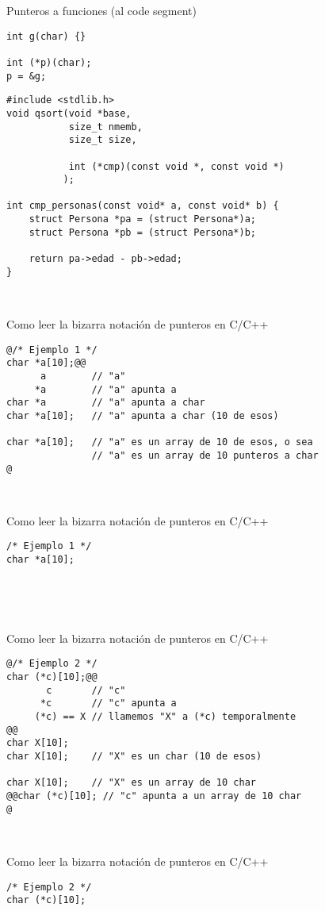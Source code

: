 \begin{frame}[fragile]{Punteros a funciones (al code segment)}
         \begin{lstlisting}[style=normal]
int g(char) {}

int (*p)(char);
p = &g;
         \end{lstlisting}
\pause
         \begin{lstlisting}[style=normal]
#include <stdlib.h>
void qsort(void *base,
           size_t nmemb,
           size_t size,

           int (*cmp)(const void *, const void *)
          );

int cmp_personas(const void* a, const void* b) {
    struct Persona *pa = (struct Persona*)a;
    struct Persona *pb = (struct Persona*)b;

    return pa->edad - pb->edad;
}

         \end{lstlisting}
\end{frame}


~%
\begin{frame}[fragile]{Como leer la bizarra notaci\'on de punteros en C/C++}
         \begin{lstlisting}[style=dimmided]
@/* Ejemplo 1 */
char *a[10];@@
      a        // "a"
     *a        // "a" apunta a
char *a        // "a" apunta a char
char *a[10];   // "a" apunta a char (10 de esos)

char *a[10];   // "a" es un array de 10 de esos, o sea
               // "a" es un array de 10 punteros a char
@
         \end{lstlisting}
\end{frame}
~%
\begin{frame}[fragile,t]{Como leer la bizarra notaci\'on de punteros en C/C++}
         \begin{lstlisting}[style=normal]
/* Ejemplo 1 */
char *a[10];
         \end{lstlisting}
\end{frame}
~%


~%
\begin{frame}[fragile]{Como leer la bizarra notaci\'on de punteros en C/C++}
         \begin{lstlisting}[style=dimmided]
@/* Ejemplo 2 */
char (*c)[10];@@
       c       // "c"
      *c       // "c" apunta a
     (*c) == X // llamemos "X" a (*c) temporalmente
@@
char X[10];
char X[10];    // "X" es un char (10 de esos)

char X[10];    // "X" es un array de 10 char
@@char (*c)[10]; // "c" apunta a un array de 10 char
@
         \end{lstlisting}
\end{frame}
~%
\begin{frame}[fragile,t]{Como leer la bizarra notaci\'on de punteros en C/C++}
         \begin{lstlisting}[style=normal]
/* Ejemplo 2 */
char (*c)[10];
         \end{lstlisting}
\end{frame}
~%


